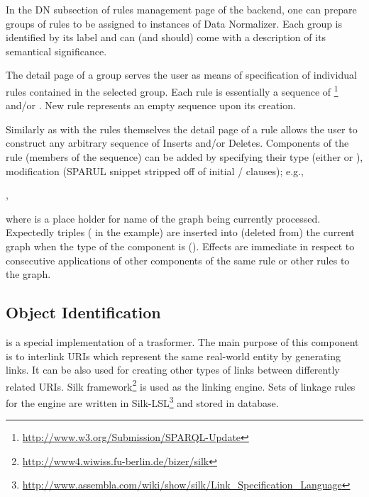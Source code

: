 In the DN subsection of rules management page of the backend, one can prepare groups of rules to be assigned to instances of {Data Normalizer}. Each group is identified by its label and can (and should) come with a description of its semantical significance.

The detail page of a group serves the user as means of specification of individual rules contained in the selected group. Each rule is essentially a sequence of \footnote{\url{http://www.w3.org/Submission/SPARQL-Update}}  and/or . New rule represents an empty sequence upon its creation.

Similarly as with the rules themselves the detail page of a rule allows the user to construct any arbitrary sequence of {Inserts} and/or {Deletes}. Components of the rule (members of the sequence) can be added by specifying their type (either  or ), modification ({SPARUL} snippet stripped off of initial  /  clauses); e.g.,

\begin{center}
	,
\end{center}

where  is a place holder for name of the graph being currently processed. Expectedly triples ( in the example) are inserted into (deleted from) the current graph when the type of the component is  (). Effects are immediate in respect to consecutive applications of other components of the same rule or other rules to the graph.

\subsection{Object Identification}
\label{sub:objectIdentification}

 is a special implementation of a {trasformer}. The main purpose of this component is to interlink URIs which represent the same real-world entity by generating  links. It can be also used for creating other types of links between differently related URIs. {Silk framework}\footnote{\url{http://www4.wiwiss.fu-berlin.de/bizer/silk}} is used as the linking engine. Sets of linkage rules for the engine are written in {Silk-LSL}\footnote{\url{http://www.assembla.com/wiki/show/silk/Link\_Specification\_Language}} and stored in database.

